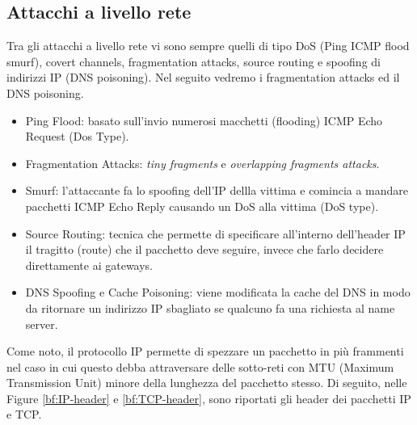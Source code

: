\subsection{Attacchi a livello rete}
Tra gli attacchi a livello rete vi sono sempre quelli di tipo DoS (Ping ICMP flood smurf), covert channels, fragmentation attacks, source routing e spoofing di indirizzi IP (DNS poisoning). Nel seguito vedremo i fragmentation attacks ed il DNS poisoning.
\begin{itemize}
\item Ping Flood: basato sull'invio numerosi macchetti (flooding) ICMP Echo Request (Dos Type).
\item Fragmentation Attacks: \textit{tiny fragments} e \textit{overlapping fragments attacks}.
\item Smurf: l'attaccante fa lo spoofing dell'IP dellla vittima e comincia a mandare pacchetti ICMP Echo Reply causando un DoS alla vittima (DoS type).
\item Source Routing: tecnica che permette di specificare all'interno dell'header IP il tragitto (route) che il pacchetto deve seguire, invece che farlo decidere direttamente ai gateways.
\item DNS Spoofing e Cache Poisoning: viene modificata la cache del DNS in modo da ritornare un indirizzo IP sbagliato se qualcuno fa una richiesta al name server.
\end{itemize}

Come noto, il protocollo IP permette di spezzare un pacchetto in più frammenti nel caso in cui questo debba attraversare delle sotto-reti con MTU (Maximum Transmission Unit) minore della lunghezza del pacchetto stesso. Di seguito, nelle Figure \ref{bf:IP-header} e \ref{bf:TCP-header}, sono riportati gli header dei pacchetti IP e TCP.

